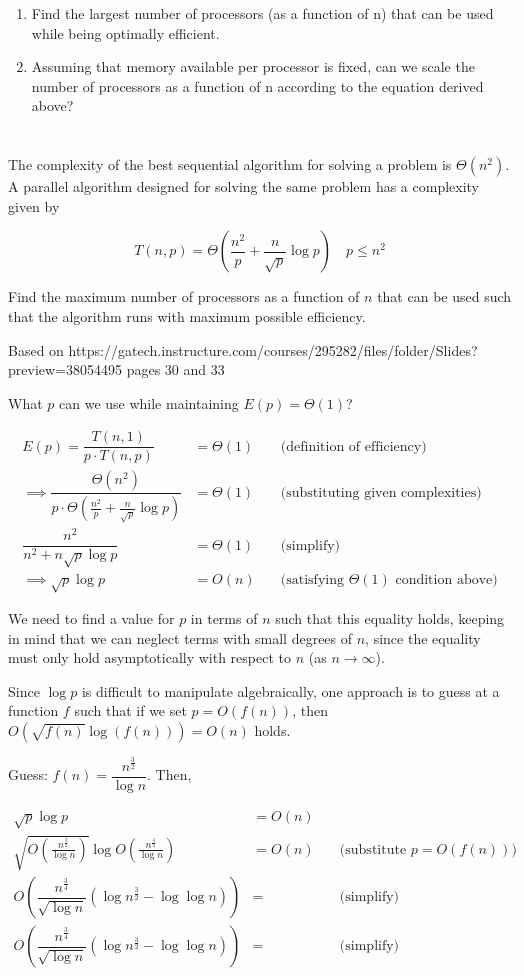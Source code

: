 \documentclass[twoside,10pt]{article}
\newcommand{\eqn}[1]{\begin{equation*}#1\end{equation*}}
\newcommand{\aln}[1]{\begin{align*}#1\end{align*}}
\begin{document}
\begin{enumerate}[label=(\alph*)]
\item Find the largest number of processors (as a function of n) that can be used while being optimally efficient.
\item Assuming that memory available per processor is fixed, can we scale the number of processors as a function of n according to the equation derived above?
\end{enumerate}

\section{}

The complexity of the best sequential algorithm for solving a problem is $\Theta(n^2)$.
A parallel algorithm designed for solving the same problem has a complexity given by

\eqn{T(n,p) = \Theta\left(\frac{n^2}{p} + \frac{n}{\sqrt{p}}\log{p}\right) \quad p \leq n^2}

Find the maximum number of processors as a function of $n$ that can be used such that the algorithm runs with maximum possible efficiency.

Based on https://gatech.instructure.com/courses/295282/files/folder/Slides?preview=38054495
pages 30 and 33

What $p$ can we use while maintaining $E(p) = \Theta(1)$?

\aln{
  E(p) = \dfrac{T(n,1)}{p \cdot T(n, p)} &= \Theta(1) &\quad \text{(definition of efficiency)}\\
  \implies \dfrac{\Theta(n^2)}{p \cdot \Theta\left(\frac{n^2}{p} + \frac{n}{\sqrt{p}}\log{p}\right)} &= \Theta(1) &\quad \text{(substituting given complexities)}\\
  \dfrac{n^2}{n^2 + n\sqrt{p}\log{p}} &= \Theta(1) &\quad \text{(simplify)}\\
  \implies \sqrt{p}\log{p} &= O(n) &\quad \text{(satisfying $\Theta(1)$ condition above)}
}

We need to find a value for $p$ in terms of $n$ such that this equality holds, keeping in mind that we can neglect terms with small degrees of $n$, since the equality must only hold asymptotically with respect to $n$ (as $n \to \infty$).

Since $\log{p}$ is difficult to manipulate algebraically, one approach is to guess at a function $f$ such that if we set $p = O(f(n))$, then $O\left(\sqrt{f(n)}\log{\left(f(n)\right)}\right) = O(n)$ holds.

Guess: $f(n) = \dfrac{n^\frac{3}{2}}{\log{n}}$.
Then,

\aln{
  \sqrt{p}\log{p} &= O(n)\\
  \sqrt{O\left(\frac{n^\frac{3}{2}}{\log{n}}\right)}\log{O\left(\frac{n^\frac{3}{2}}{\log{n}}\right)} &= O(n) &\quad\text{(substitute $p = O(f(n))$)}\\
  O\left(\dfrac{n^\frac{3}{4}}{\sqrt{\log{n}}}\left(\log{n^\frac{3}{2}} - \log\log{n}\right)\right) &= &\quad\text{(simplify)}\\
  O\left(\dfrac{n^\frac{3}{4}}{\sqrt{\log{n}}}\left(\log{n^\frac{3}{2}} - \log\log{n}\right)\right) &= &\quad\text{(simplify)}\\
}
\end{document}
